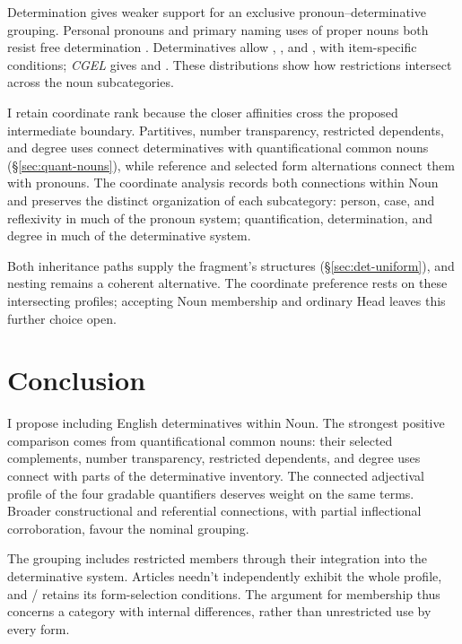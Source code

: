 \documentclass[12pt]{article}
\begin{document}
Determination gives weaker support for an exclusive pronoun--determinative grouping. Personal pronouns and primary naming uses of proper nouns both resist free determination \citep[429--430, 517, 519--520]{huddleston2002}. Determinatives allow , , and , with item-specific conditions; \textit{CGEL} gives  and  \citep[415--416]{huddleston2002}. These distributions show how restrictions intersect across the noun subcategories.

I retain coordinate rank because the closer affinities cross the proposed intermediate boundary. Partitives, number transparency, restricted dependents, and degree uses connect determinatives with quantificational common nouns (§\ref{sec:quant-nouns}), while reference and selected form alternations connect them with pronouns. The coordinate analysis records both connections within Noun and preserves the distinct organization of each subcategory: person, case, and reflexivity in much of the pronoun system; quantification, determination, and degree in much of the determinative system.

Both inheritance paths supply the fragment's structures (§\ref{sec:det-uniform}), and nesting remains a coherent alternative. The coordinate preference rests on these intersecting profiles; accepting Noun membership and ordinary Head leaves this further choice open.

\section{Conclusion}\label{sec:conclusion}

I propose including English determinatives within Noun. The strongest positive comparison comes from quantificational common nouns: their selected complements, number transparency, restricted dependents, and degree uses connect with parts of the determinative inventory. The connected adjectival profile of the four gradable quantifiers deserves weight on the same terms. Broader constructional and referential connections, with partial inflectional corroboration, favour the nominal grouping.

The grouping includes restricted members through their integration into the determinative system. Articles needn't independently exhibit the whole profile, and / retains its form-selection conditions. The argument for membership thus concerns a category with internal differences, rather than unrestricted use by every form.
\end{document}
